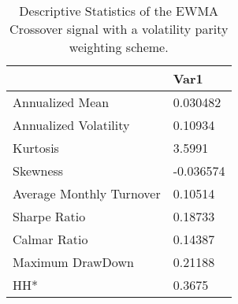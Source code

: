 \begin{table}[H]
\centering
\begin{tabular}{ll}
& Var1 \\ 
\hline 
Annualized Mean & 0.030482 \\ 
Annualized Volatility & 0.10934 \\ 
Kurtosis & 3.5991 \\ 
Skewness & -0.036574 \\ 
Average Monthly Turnover & 0.10514 \\ 
Sharpe Ratio & 0.18733 \\ 
Calmar Ratio & 0.14387 \\ 
Maximum DrawDown & 0.21188 \\ 
HH* & 0.3675 \\ 
\hline
\end{tabular}
\caption{Descriptive Statistics of the EWMA Crossover signal with a volatility parity weighting scheme.}
\label{MBBSLeverage}
\end{table}